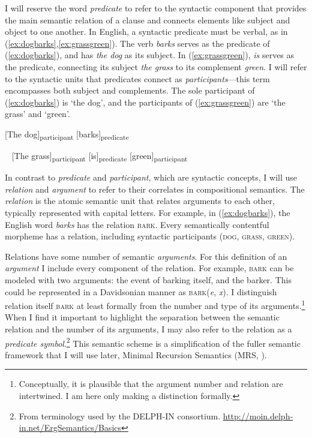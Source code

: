 I will reserve the word \textit{predicate} to refer to the syntactic component that provides the main semantic relation of a clause and connects elements like subject and object to one another. In English, a syntactic predicate must be verbal, as in (\ref{ex:dogbarks},\ref{ex:grassgreen}). The verb \textit{barks} serves as the predicate of (\ref{ex:dogbarks}), and has \textit{the dog} as its subject. In (\ref{ex:grassgreen}), \textit{is} serves as the predicate, connecting its subject \textit{the grass} to its complement \textit{green}. I will refer to the syntactic units that predicates connect as \textit{participants}---this term encompasses both subject and complements. The sole participant of (\ref{ex:dogbarks}) is `the dog', and the participants of (\ref{ex:grassgreen}) are `the grass' and `green'.

\ex \label{ex:dogbarks}
[The dog]\textsubscript{participant} [barks]\textsubscript{predicate}
\xe

\ex~ \label{ex:grassgreen}
[The grass]\textsubscript{participant} [is]\textsubscript{predicate} [green]\textsubscript{participant}
\xe

In contrast to \textit{predicate} and \textit{participant}, which are syntactic concepts, I will use \textit{relation} and \textit{argument} to refer to their correlates in compositional semantics. The \textit{relation} is the atomic semantic unit that relates arguments to each other, typically represented with capital letters. For example, in (\ref{ex:dogbarks}), the English word \textit{barks} has the relation \textsc{bark}. Every semantically contentful morpheme has a relation, including syntactic participants (\textsc{dog}, \textsc{grass}, \textsc{green}).

Relations have some number of semantic \textit{arguments}. For this definition of an \textit{argument} I include every component of the relation. For example, \textsc{bark} can be modeled with two arguments: the event of barking itself, and the barker. This could be represented in a Davidsonian manner \citep{davidson1967} as \textsc{bark}(\textit{e}, \textit{x}). I distinguish relation itself \textsc{bark} at least formally from the number and type of its arguments.\footnote{Conceptually, it is plausible that the argument number and relation are intertwined. I am here only making a distinction formally.} When I find it important to highlight the separation between the semantic relation and the number of its arguments, I may also refer to the relation as a \textit{predicate symbol}.\footnote{From terminology used by the DELPH-IN consortium. \url{http://moin.delph-in.net/ErgSemantics/Basics}} This semantic scheme is a simplification of the fuller semantic framework that I will use later, Minimal Recursion Semantics (MRS, \citealt{copestake2005}).


